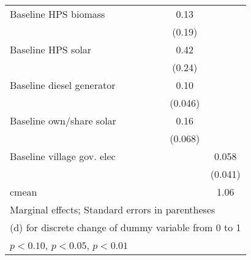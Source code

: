 \begin{table}[htbp]
\begin{tabular*}{1\hsize}{@{\hskip\tabcolsep\extracolsep\fill}l*{6}{c}}
Baseline HPS biomass&                  &                  &                  &                  &     0.13         &                  \\
                &                  &                  &                  &                  &   (0.19)         &                  \\
Baseline HPS solar&                  &                  &                  &                  &     0.42\sym{*}  &                  \\
                &                  &                  &                  &                  &   (0.24)         &                  \\
Baseline diesel generator&                  &                  &                  &                  &     0.10\sym{**} &                  \\
                &                  &                  &                  &                  &  (0.046)         &                  \\
Baseline own/share solar&                  &                  &                  &                  &     0.16\sym{**} &                  \\
                &                  &                  &                  &                  &  (0.068)         &                  \\
Baseline village gov. elec&                  &                  &                  &                  &                  &    0.058         \\
                &                  &                  &                  &                  &                  &  (0.041)         \\
\midrule
cmean           &                  &                  &                  &                  &                  &     1.06         \\
\bottomrule
\multicolumn{7}{l}{\footnotesize Marginal effects; Standard errors in parentheses}\\
\multicolumn{7}{l}{\footnotesize  (d) for discrete change of dummy variable from 0 to 1}\\
\multicolumn{7}{l}{\footnotesize \sym{*} \(p<0.10\), \sym{**} \(p<0.05\), \sym{***} \(p<0.01\)}\\
\end{tabular*}
\end{table}
